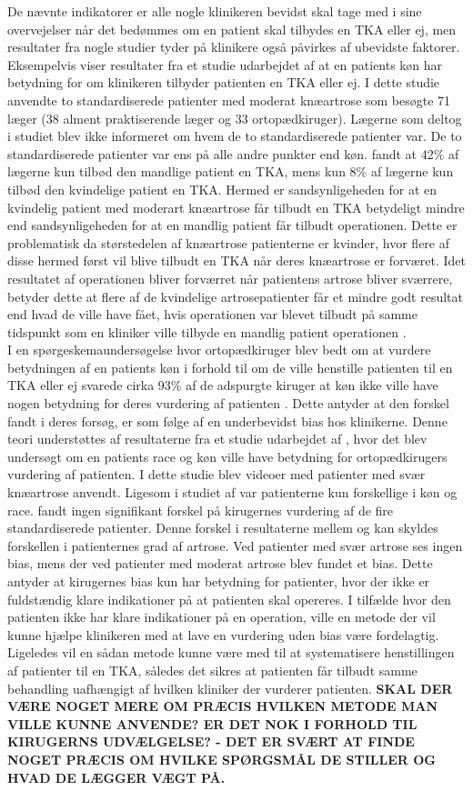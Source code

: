 De nævnte indikatorer er alle nogle klinikeren bevidst skal tage med i sine overvejelser når det bedømmes om en patient skal tilbydes en TKA eller ej, men resultater fra nogle studier tyder på klinikere også påvirkes af ubevidste faktorer. Eksempelvis viser resultater fra et studie udarbejdet af \cite{borkhoff2008} at en patients køn har betydning for om klinikeren tilbyder patienten en TKA eller ej. I dette studie anvendte \cite{borkhoff2008} to standardiserede patienter med moderat knæartrose som besøgte 71 læger (38 alment praktiserende læger og 33 ortopædkiruger). Lægerne som deltog i studiet blev ikke informeret om hvem de to standardiserede patienter var. De to standardiserede patienter var ens på alle andre punkter end køn. \cite{borkhoff2008} fandt at 42\% af lægerne kun tilbød den mandlige patient en TKA, mens kun 8\% af lægerne kun tilbød den kvindelige patient en TKA. Hermed er sandsynligeheden for at en kvindelig patient med moderart knæartrose får tilbudt en TKA betydeligt mindre end sandsynligeheden for at en mandlig patient får tilbudt operationen. Dette er problematisk da størstedelen af knæartrose patienterne er kvinder, hvor flere af disse hermed først vil blive tilbudt en TKA når deres knæartrose er forværet. Idet resultatet af operationen bliver forværret når patientens artrose bliver sværrere, betyder dette at flere af de kvindelige artrosepatienter får et mindre godt resultat end hvad de ville have fået, hvis operationen var blevet tilbudt på samme tidspunkt som en kliniker ville tilbyde en mandlig patient operationen \citep{borkhoff2008}. \\
I en spørgeskemaundersøgelse hvor ortopædkiruger blev bedt om at vurdere betydningen af en patients køn i forhold til om de ville henstille patienten til en TKA eller ej svarede cirka 93\% af de adspurgte kiruger at køn ikke ville have nogen betydning for deres vurdering af patienten \citep{wright1995}. Dette antyder at den forskel \cite{borkhoff2008} fandt i deres forsøg, er som følge af en underbevidst bias hos klinikerne. Denne teori understøttes af resultaterne fra et studie udarbejdet af \cite{dy2014}, hvor det blev undersøgt om en patients race og køn ville have betydning for ortopædkirugers vurdering af patienten. I dette studie blev videoer med patienter med svær knæartrose anvendt. Ligesom i studiet af \cite{borkhoff2008} var patienterne kun forskellige i køn og race. \cite{dy2014} fandt ingen signifikant forskel på kirugernes vurdering af de fire standardiserede patienter. Denne forskel i resultaterne mellem \cite{borkhoff2008} og \cite{dy2014} kan skyldes forskellen i patienternes grad af artrose. Ved patienter med svær artrose ses ingen bias, mens der ved patienter med moderat artrose blev fundet et bias. Dette antyder at kirugernes bias kun har betydning for patienter, hvor der ikke er fuldstændig klare indikationer på at patienten skal opereres. I tilfælde hvor den patienten ikke har klare indikationer på en operation, ville en metode der vil kunne hjælpe klinikeren med at lave en vurdering uden bias være fordelagtig. Ligeledes vil en sådan metode kunne være med til at systematisere henstillingen af patienter til en TKA, således det sikres at patienten får tilbudt samme behandling uafhængigt af hvilken kliniker der vurderer patienten. 
\textbf{SKAL DER VÆRE NOGET MERE OM PRÆCIS HVILKEN METODE MAN VILLE KUNNE ANVENDE? ER DET NOK I FORHOLD TIL KIRUGERNS UDVÆLGELSE? - DET ER SVÆRT AT FINDE NOGET PRÆCIS OM HVILKE SPØRGSMÅL DE STILLER OG HVAD DE LÆGGER VÆGT PÅ.} 


   
